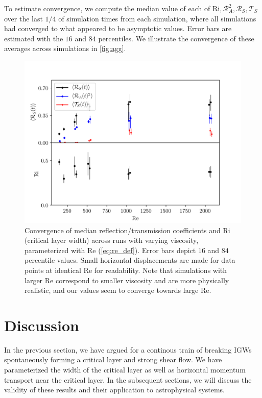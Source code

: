 \documentclass[
        fleqn,
        usenatbib,
    ]{mnras}
\begin{document}
To estimate convergence, we compute the median value of each of $\mathrm{Ri},
\mathcal{R}_A^2, \mathcal{R}_S, \mathcal{T}_S$ over the last $1/4$ of simulation
times from each simulation, where all simulations had converged to what appeared
to be asymptotic values. Error bars are estimated with the $16$ and $84$
percentiles. We illustrate the convergence of these averages across simulations
in \autoref{fig:agg}.
\begin{figure}[t]
    \centering
    \includegraphics[width=\columnwidth]{plots/agg.png}
    \caption{Convergence of median reflection/transmission coefficients and
    $\mathrm{Ri}$ (critical layer width) across runs with varying viscosity,
    parameterized with $\mathrm{Re}$ (\autoref{eq:re_def}). Error bars depict
    $16$ and $84$ percentile values. Small horizontal displacements are made for
    data points at identical $\mathrm{Re}$ for readability. Note that
    simulations with larger $\mathrm{Re}$ correspond to smaller viscosity and
    are more physically realistic, and our values seem to converge towards large
    $\mathrm{Re}$.}\label{fig:agg}
\end{figure}

\section{Discussion}\label{s:discussion}

In the previous section, we have argued for a continous train of breaking IGWs
spontaneously forming a critical layer and strong shear flow. We have
parameterized the width of the critical layer as well as horizontal momentum
transport near the critical layer. In the subsequent sections, we will discuss
the validity of these results and their application to astrophysical systems.
\end{document}

